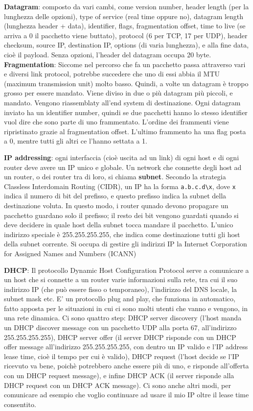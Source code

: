 \documentclass[a4paper,10pt]{article} %
\renewcommand{\b}[1]{%
    {\textbf{#1}}}
\renewcommand{\t}[1]{%
    {\texttt{#1}}}
\begin{document}
\b{Datagram}: composto da vari cambi, come version number, header length (per la lunghezza delle opzioni), type of service (real time oppure no), datagram length (lunghezza header + data), identifier, flags, fragmentation offset, time to live (se arriva a 0 il pacchetto viene buttato), protocol (6 per TCP, 17 per UDP), header checksum, source IP, destination IP, options (di varia lunghezza), e alla fine data, cioè il payload. Senza opzioni, l'header del datagram occupa 20 byte.
\b{Fragmentation}: Siccome nel percorso che fa un pacchetto passa attraverso vari e diversi link protocol, potrebbe succedere che uno di essi abbia il MTU (maximum transmission unit) molto basso. Quindi, a volte un datagram è troppo grosso per essere mandato. Viene diviso in due o più datagram più piccoli, e mandato. Vengono riassemblaty all'end system di destinazione. Ogni datagram inviato ha un identifier number, quindi se due pacchetti hanno lo stesso identifier vuol dire che sono parte di uno frammentato. L'ordine dei frammenti viene ripristinato grazie al fragmentation offset. L'ultimo frammento ha una flag posta a 0, mentre tutti gli altri ce l'hanno settata a 1.

\b{IP addressing}: ogni interfaccia (cioè uscita ad un link) di ogni host e di ogni router deve avere un IP unico e globale. Un network che connette degli host ad un router, o dei router tra di loro, si chiama \b{subnet}. Secondo la strategia Classless Interdomain Routing (CIDR), un IP ha la forma \t{a.b.c.d\textbackslash x}, dove \t{x} indica il numero di bit del prefisso, e questo prefisso indica la subnet della destinazione voluta. In questo modo, i router qunado devono propagare un pacchetto guardano solo il prefisso; il resto dei bit vengono guardati quando si deve decidere in quale host della subnet tocca mandare il pacchetto. L'unico indirizzo speciale è 255.255.255.255, che indica come destinazione tutti gli host della subnet corrente. Si occupa di gestire gli indirizzi IP la Internet Corporation for Assigned Names and Numbers (ICANN)

\b{DHCP}: Il protocollo Dynamic Host Configuration Protocol serve a comunicare a un host che si connette a un router varie informazioni sulla rete, tra cui il suo indirizzo IP (che può essere fisso o temporaneo), l'indirizzo del DNS locale, la subnet mask etc. E' un protocollo plug and play, che funziona in automatico, fatto apposta per le situazioni in cui ci sono molti utenti che vanno e vengono, in una rete dinamica. Ci sono quattro step: DHCP server discovery (l'host manda un DHCP discover message con un pacchetto UDP alla porta 67, all'indirizzo 255.255.255.255), DHCP server offer (il server DHCP risponde con un DHCP offer message all'indirizzo 255.255.255.255, con dentro un IP valido e l'IP address lease time, cioè il tempo per cui è valido), DHCP request (l'host decide se l'IP ricevuto va bene, poichè potrebbero anche essere più di uno, e risponde all'offerta con un DHCP request message), e infine DHCP ACK (il server risponde alla DHCP request con un DHCP ACK message). Ci sono anche altri modi, per comunicare ad esempio che voglio continuare ad usare il mio IP oltre il lease time consentito.
\end{document}

